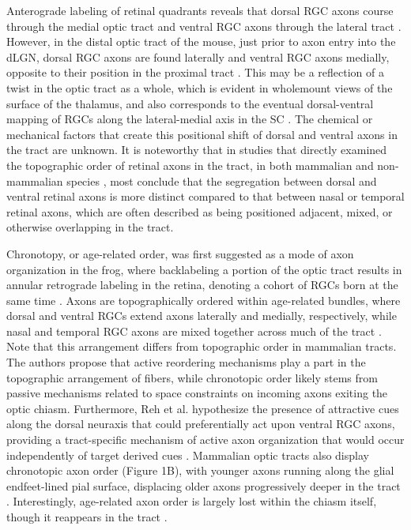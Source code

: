 Anterograde labeling of retinal quadrants reveals that dorsal RGC axons course through the medial optic tract and ventral RGC axons through the lateral tract \cite{chan1999changes, chan1994changes, plas2005pretarget, reese1993reestablishment, reese1990fibre, reh1983organization}. 
However, in the distal optic tract of the mouse, just prior to axon entry into the dLGN, dorsal RGC axons are found laterally and ventral RGC axons medially, opposite to their position in the proximal tract \cite{plas2005pretarget}. %
This may be a reflection of a twist in the optic tract as a whole, which is evident in wholemount views of the surface of the thalamus, and also corresponds to the eventual dorsal-ventral mapping of RGCs along the lateral-medial axis in the SC \cite{plas2005pretarget}. 
The chemical or mechanical factors that create this positional shift of dorsal and ventral axons in the tract are unknown. 
It is noteworthy that in studies that directly examined the topographic order of retinal axons in the tract, in both mammalian \cite{chan1994changes, plas2005pretarget, reese1993reestablishment} and non-mammalian species \cite{ehrlich1984course, montgomery1998organization, reh1983organization, thanos1983investigations}, most conclude that the segregation between dorsal and ventral retinal axons is more distinct compared to that between nasal or temporal retinal axons, which are often described as being positioned adjacent, mixed, or otherwise overlapping in the tract. 

Chronotopy, or age-related order, was first suggested as a mode of axon organization in the frog, where backlabeling a portion of the optic tract results in annular retrograde labeling in the retina, denoting a cohort of RGCs born at the same time \cite{fawcett1984fibre, reh1983organization}. 
Axons are topographically ordered within age-related bundles, where dorsal and ventral RGCs extend axons laterally and medially, respectively, while nasal and temporal RGC axons are mixed together across much of the tract \cite{reh1983organization}. 
Note that this arrangement differs from topographic order in mammalian tracts. 
The authors propose that active reordering mechanisms play a part in the topographic arrangement of fibers, while chronotopic order likely stems from passive mechanisms related to space constraints on incoming axons exiting the optic chiasm. 
Furthermore, Reh et al. hypothesize the presence of attractive cues along the dorsal neuraxis that could preferentially act upon ventral RGC axons, providing a tract-specific mechanism of active axon organization that would occur independently of target derived cues \cite{reh1983organization}. 
Mammalian optic tracts also display chronotopic axon order (Figure 1B), with younger axons running along the glial endfeet-lined pial surface, displacing older axons progressively deeper in the tract \cite{colello1992observations, reese1987distributionrat, reese1990fibre, reese1997chronotopic, walsh1985age}. %
Interestingly, age-related axon order is largely lost within the chiasm itself, though it reappears in the tract \cite{colello1998changing}. 

